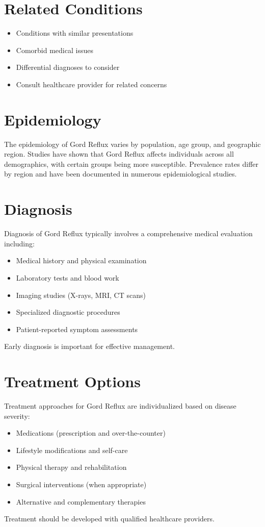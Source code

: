 \section*{Related Conditions}
\begin{itemize}
  \item Conditions with similar presentations
  \item Comorbid medical issues
  \item Differential diagnoses to consider
  \item Consult healthcare provider for related concerns
\end{itemize}

\section*{Epidemiology}
The epidemiology of Gord Reflux varies by population, age group, and geographic region. Studies have shown that Gord Reflux affects individuals across all demographics, with certain groups being more susceptible. Prevalence rates differ by region and have been documented in numerous epidemiological studies.

\section*{Diagnosis}
Diagnosis of Gord Reflux typically involves a comprehensive medical evaluation including:
\begin{itemize}
  \item Medical history and physical examination
  \item Laboratory tests and blood work
  \item Imaging studies (X-rays, MRI, CT scans)
  \item Specialized diagnostic procedures
  \item Patient-reported symptom assessments
\end{itemize}
Early diagnosis is important for effective management.

\section*{Treatment Options}
Treatment approaches for Gord Reflux are individualized based on disease severity:
\begin{itemize}
  \item Medications (prescription and over-the-counter)
  \item Lifestyle modifications and self-care
  \item Physical therapy and rehabilitation
  \item Surgical interventions (when appropriate)
  \item Alternative and complementary therapies
\end{itemize}
Treatment should be developed with qualified healthcare providers.

